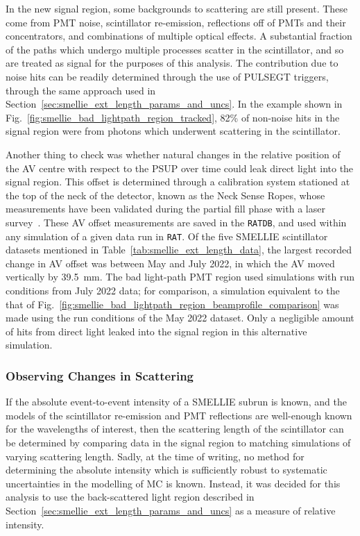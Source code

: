 In the new signal region, some backgrounds to scattering are still present. These come from PMT noise, scintillator re-emission, reflections off of PMTs and their concentrators, and combinations of multiple optical effects. A substantial fraction of the paths which undergo multiple processes scatter in the scintillator, and so are treated as signal for the purposes of this analysis. The contribution due to noise hits can be readily determined through the use of PULSEGT triggers, through the same approach used in Section~\ref{sec:smellie_ext_length_params_and_uncs}. In the example shown in Fig.~\ref{fig:smellie_bad_lightpath_region_tracked}, 82\% of non-noise hits in the signal region were from photons which underwent scattering in the scintillator.

Another thing to check was whether natural changes in the relative position of the AV centre with respect to the PSUP over time could leak direct light into the signal region. This offset is determined through a calibration system stationed at the top of the neck of the detector, known as the Neck Sense Ropes, whose measurements have been validated during the partial fill phase with a laser survey~\cite{khaghaniNeckSenseRope2015,khaghani16NCalibrationBackground2022}. These AV offset measurements are saved in the \texttt{RATDB}, and used within any simulation of a given data run in \texttt{RAT}. Of the five SMELLIE scintillator datasets mentioned in Table~\ref{tab:smellie_ext_length_data}, the largest recorded change in AV offset was between May and July 2022, in which the AV moved vertically by \SI{39.5}{\mm}. The bad light-path PMT region used simulations with run conditions from July 2022 data; for comparison, a simulation equivalent to the that of Fig.~\ref{fig:smellie_bad_lightpath_region_beamprofile_comparison} was made using the run conditions of the May 2022 dataset. Only a negligible amount of hits from direct light leaked into the signal region in this alternative simulation.

\subsubsection{Observing Changes in Scattering}
If the absolute event-to-event intensity of a SMELLIE subrun is known, and the models of the scintillator re-emission and PMT reflections are well-enough known for the wavelengths of interest, then the scattering length of the scintillator can be determined by comparing data in the signal region to matching simulations of varying scattering length. Sadly, at the time of writing, no method for determining the absolute intensity which is sufficiently robust to systematic uncertainties in the modelling of MC is known. Instead, it was decided for this analysis to use the back-scattered light region described in Section~\ref{sec:smellie_ext_length_params_and_uncs} as a measure of relative intensity.

